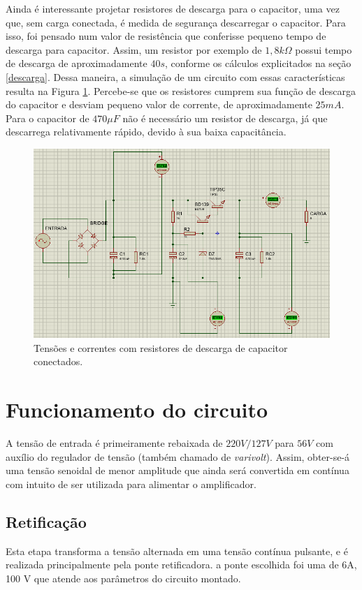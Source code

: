 \documentclass[a4paper,12pt,oneside,openany,table,xcdraw]{article}
\begin{document}
Ainda é interessante projetar resistores de descarga para o capacitor, uma vez que, sem carga conectada, é medida de segurança descarregar o capacitor.
Para isso, foi pensado num valor de resistência que conferisse pequeno tempo de descarga para capacitor. Assim, um resistor por exemplo de $1,8k\Omega$ possui tempo de descarga de aproximadamente $40s$, conforme os cálculos explicitados na seção \ref{descarga}. Dessa maneira, a simulação de um circuito com essas características resulta na Figura \ref{sim3}. Percebe-se que os resistores cumprem sua função de descarga do capacitor e desviam pequeno valor de corrente, de aproximadamente $25mA$. Para o capacitor de $470\mu F$ não é necessário um resistor de descarga, já que descarrega relativamente rápido, devido à sua baixa capacitância.

\begin{figure}[H]
\centering
\captionsetup{font=scriptsize}
\includegraphics[width=15cm]{sim3}
\caption{Tensões e correntes com resistores de descarga de capacitor conectados.}
\label{sim3}
\end{figure}

\newpage
\section{Funcionamento do circuito}
A tensão de entrada é primeiramente rebaixada de $220V/127V$ para $56V$ com auxílio do regulador de tensão (também chamado de \emph{varivolt}). Assim, obter-se-á uma tensão senoidal de menor amplitude que ainda será convertida em contínua com intuito de ser utilizada para alimentar o amplificador.

\subsection{Retificação}
Esta etapa transforma a tensão alternada em uma tensão contínua pulsante, e é realizada principalmente pela ponte retificadora. a ponte escolhida foi uma de 6A, 100 V que atende aos parâmetros do circuito montado.
\end{document}
